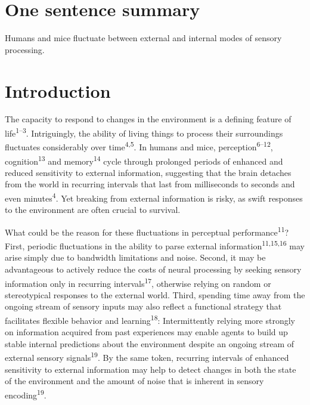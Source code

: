 \documentclass[
]{article}
\begin{document}
\hypertarget{one-sentence-summary}{%
\section{One sentence summary}\label{one-sentence-summary}}

Humans and mice fluctuate between external and internal modes of sensory
processing.

\hfill\break

\newpage

\hypertarget{introduction}{%
\section{Introduction}\label{introduction}}

The capacity to respond to changes in the environment is a defining
feature of life\textsuperscript{1--3}. Intriguingly, the ability of
living things to process their surroundings fluctuates considerably over
time\textsuperscript{4,5}. In humans and mice,
perception\textsuperscript{6--12}, cognition\textsuperscript{13} and
memory\textsuperscript{14} cycle through prolonged periods of enhanced
and reduced sensitivity to external information, suggesting that the
brain detaches from the world in recurring intervals that last from
milliseconds to seconds and even minutes\textsuperscript{4}. Yet
breaking from external information is risky, as swift responses to the
environment are often crucial to survival.

What could be the reason for these fluctuations in perceptual
performance\textsuperscript{11}? First, periodic fluctuations in the
ability to parse external information\textsuperscript{11,15,16} may
arise simply due to bandwidth limitations and noise. Second, it may be
advantageous to actively reduce the costs of neural processing by
seeking sensory information only in recurring
intervals\textsuperscript{17}, otherwise relying on random or
stereotypical responses to the external world. Third, spending time away
from the ongoing stream of sensory inputs may also reflect a functional
strategy that facilitates flexible behavior and
learning\textsuperscript{18}: Intermittently relying more strongly on
information acquired from past experiences may enable agents to build up
stable internal predictions about the environment despite an ongoing
stream of external sensory signals\textsuperscript{19}. By the same
token, recurring intervals of enhanced sensitivity to external
information may help to detect changes in both the state of the
environment and the amount of noise that is inherent in sensory
encoding\textsuperscript{19}.
\end{document}
